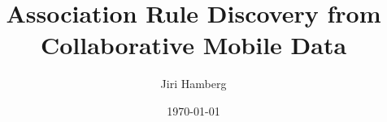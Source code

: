 \documentclass[english]{tktltiki2}
\title{Association Rule Discovery from Collaborative Mobile Data}
\author{Jiri Hamberg}
\date{\today}
\theoremstyle{definition}
\theoremstyle{remark}
\begin{document}

\frontmatter      %

\maketitle        %
\makeabstract     %

\tableofcontents  %


\mainmatter       %



\clearpage

\clearpage

\clearpage

\clearpage

\clearpage

\clearpage

\clearpage



%
%
% 
%

\clearpage







% 
\end{document}

